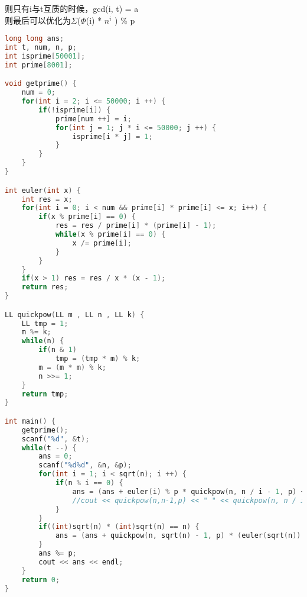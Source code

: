 则只有i与t互质的时候，gcd(i, t) = a\\
则最后可以优化为$\Sigma$($\Phi$(i) * $n^{i}$ ) \% p
    \begin{lstlisting}[language=c++]
long long ans;
int t, num, n, p;
int isprime[50001];
int prime[8001];

void getprime() {
    num = 0;
    for(int i = 2; i <= 50000; i ++) {
        if(!isprime[i]) {
            prime[num ++] = i;
            for(int j = 1; j * i <= 50000; j ++) {
                isprime[i * j] = 1;
            }
        }
    }
}

int euler(int x) {
    int res = x;
    for(int i = 0; i < num && prime[i] * prime[i] <= x; i++) {
        if(x % prime[i] == 0) {
            res = res / prime[i] * (prime[i] - 1);
            while(x % prime[i] == 0) {
                x /= prime[i];
            }
        }
    }
    if(x > 1) res = res / x * (x - 1);
    return res;
}

LL quickpow(LL m , LL n , LL k) {
    LL tmp = 1; 
    m %= k;
    while(n) { 
        if(n & 1)
            tmp = (tmp * m) % k; 
        m = (m * m) % k;
        n >>= 1;
    } 
    return tmp;
} 

int main() {
    getprime();
    scanf("%d", &t);
    while(t --) {
        ans = 0;
        scanf("%d%d", &n, &p);
        for(int i = 1; i < sqrt(n); i ++) {
            if(n % i == 0) {
                ans = (ans + euler(i) % p * quickpow(n, n / i - 1, p) + euler(n / i) % p * quickpow(n, i - 1, p)) % p;
                //cout << quickpow(n,n-1,p) << " " << quickpow(n, n / i - 1, p) << " " << euler(i) << " " << euler(n / i) << endl;
            }
        }
        if((int)sqrt(n) * (int)sqrt(n) == n) {
            ans = (ans + quickpow(n, sqrt(n) - 1, p) * (euler(sqrt(n)) % p)) % p;
        }
        ans %= p;
        cout << ans << endl;
    }
    return 0;
}
    \end{lstlisting}
